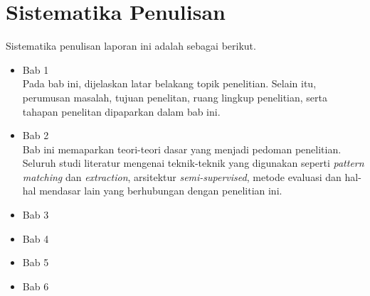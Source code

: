 \section{Sistematika Penulisan}
Sistematika penulisan laporan ini adalah sebagai berikut.
\begin{itemize}
	\item Bab 1 \babSatu \\
	Pada bab ini, dijelaskan latar belakang topik penelitian. Selain itu, perumusan masalah, tujuan penelitan, ruang lingkup penelitian, serta tahapan penelitan dipaparkan dalam bab ini.
	\item Bab 2 \babDua \\
	Bab ini memaparkan teori-teori dasar yang menjadi pedoman penelitian. Seluruh studi literatur mengenai teknik-teknik yang digunakan seperti \textit{pattern matching} dan \textit{extraction}, arsitektur \textit{semi-supervised}, metode evaluasi dan hal-hal mendasar lain yang berhubungan dengan penelitian ini.
	\item Bab 3 \babTiga \\
	\item Bab 4 \babEmpat \\
	\item Bab 5 \babLima \\
	\item Bab 6 \babEnam \\
\end{itemize}

